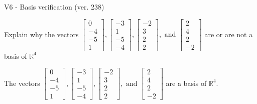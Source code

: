 \begin{exercise}
  \begin{exerciseTitle}V6 - Basis verification (ver. 238)\end{exerciseTitle}
  \begin{exerciseStatement}
    Explain why the vectors \(\left[\begin{array}{r}
0 \\
-4 \\
-5 \\
1
\end{array}\right] , \left[\begin{array}{r}
-3 \\
1 \\
-5 \\
-4
\end{array}\right] , \left[\begin{array}{r}
-2 \\
3 \\
2 \\
2
\end{array}\right] , \text{ and } \left[\begin{array}{r}
2 \\
4 \\
2 \\
-2
\end{array}\right]\) are or are not a basis of \(\mathbb{R}^4\)	


  \end{exerciseStatement}
  \begin{exerciseAnswer}
   The vectors \(\left[\begin{array}{r}
0 \\
-4 \\
-5 \\
1
\end{array}\right] , \left[\begin{array}{r}
-3 \\
1 \\
-5 \\
-4
\end{array}\right] , \left[\begin{array}{r}
-2 \\
3 \\
2 \\
2
\end{array}\right] , \text{ and } \left[\begin{array}{r}
2 \\
4 \\
2 \\
-2
\end{array}\right]\) 
  	 are  a basis of \(\mathbb{R}^4\).
  


  \end{exerciseAnswer}
\end{exercise}
